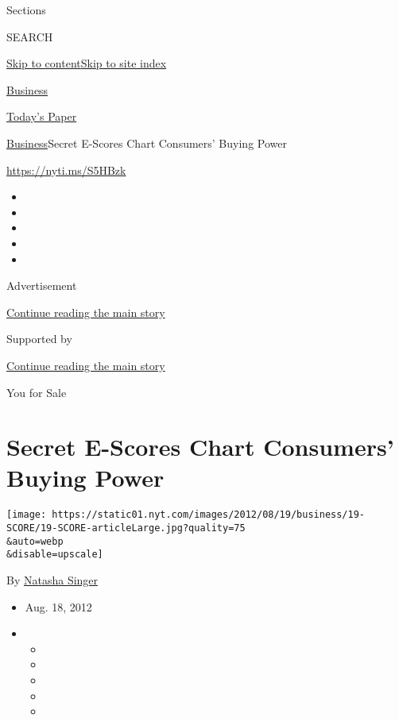 Sections

SEARCH

\protect\hyperlink{site-content}{Skip to
content}\protect\hyperlink{site-index}{Skip to site index}

\href{https://www.nytimes.com/section/business}{Business}

\href{https://myaccount.nytimes.com/auth/login?response_type=cookie\&client_id=vi}{}

\href{https://www.nytimes.com/section/todayspaper}{Today's Paper}

\href{/section/business}{Business}\textbar{}Secret E-Scores Chart
Consumers' Buying Power

\url{https://nyti.ms/S5HBzk}

\begin{itemize}
\item
\item
\item
\item
\item
\end{itemize}

Advertisement

\protect\hyperlink{after-top}{Continue reading the main story}

Supported by

\protect\hyperlink{after-sponsor}{Continue reading the main story}

You for Sale

\hypertarget{secret-e-scores-chart-consumers-buying-power}{%
\section{Secret E-Scores Chart Consumers' Buying
Power}\label{secret-e-scores-chart-consumers-buying-power}}

\texttt{[image: https://static01.nyt.com/images/2012/08/19/business/19-SCORE/19-SCORE-articleLarge.jpg?quality=75\\\&auto=webp\\\&disable=upscale]}

By \href{https://www.nytimes.com/by/natasha-singer}{Natasha Singer}

\begin{itemize}
\item
  Aug. 18, 2012
\item
  \begin{itemize}
  \item
  \item
  \item
  \item
  \item
  \end{itemize}
\end{itemize}

